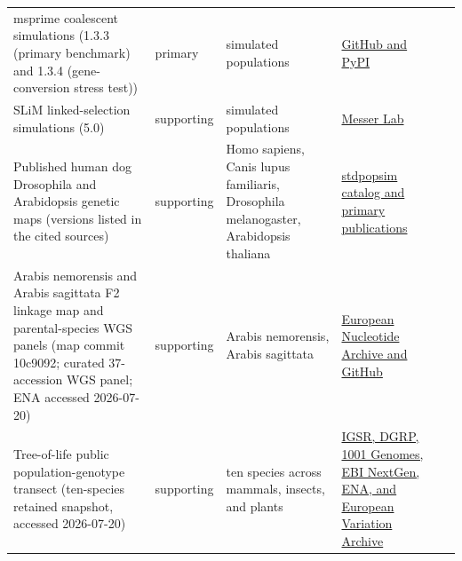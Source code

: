 \begin{longtable}{@{}p{}p{}p{}p{}p{}@{}}
msprime coalescent simulations (1.3.3 (primary benchmark) and 1.3.4 (gene-conversion stress test)) & primary & simulated populations & \href{https://github.com/tskit-dev/msprime/releases/tag/1.3.4}{GitHub and PyPI} & \citep{baumdicker2022msprime} \\
SLiM linked-selection simulations (5.0) & supporting & simulated populations & \href{https://messerlab.org/slim/}{Messer Lab} & \citep{haller2026slim5} \\
Published human dog Drosophila and Arabidopsis genetic maps (versions listed in the cited sources) & supporting & Homo sapiens, Canis lupus familiaris, Drosophila melanogaster, Arabidopsis thaliana & \href{https://popsim-consortium.github.io/stdpopsim-docs/stable/catalog.html}{stdpopsim catalog and primary publications} & \citep{halldorsson2019decode,hapmap2007,campbell2016dog,comeron2012drosophila,salome2012arabidopsis} \\
Arabis nemorensis and Arabis sagittata F2 linkage map and parental-species WGS panels (map commit 10c9092; curated 37-accession WGS panel; ENA accessed 2026-07-20) & supporting & Arabis nemorensis, Arabis sagittata & \href{https://www.ebi.ac.uk/ena/browser/view/PRJEB89863}{European Nucleotide Archive and GitHub} & \citep{rahnamae2026arabis,dittberner2022arabis} \\
Tree-of-life public population-genotype transect (ten-species retained snapshot, accessed 2026-07-20) & supporting & ten species across mammals, insects, and plants & \href{https://www.ebi.ac.uk/eva/}{IGSR, DGRP, 1001 Genomes, EBI NextGen, ENA, and European Variation Archive} & \citep{1000genomes2015,nextgen_project,todd2022donkey,mackay2012dgrp,huang2014dgrp,pannebakker2020nasonia,genomes1001_2016,wang2018aspen,robinson2024aspen,chestnut_prjeb87510,cezard2022eva} \\
\bottomrule
\end{longtable}

